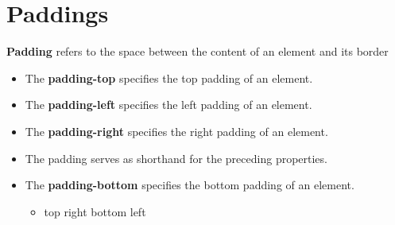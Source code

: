 \documentclass{report}
\begin{document}
    \pagebreak \bigbreak \noindent 
    \section{\LARGE Paddings}
    \bigbreak \noindent 
    \textbf{Padding} refers to the space between the content of an element and its border
    \bigbreak \noindent 
        \begin{itemize}
        \item The \textbf{padding-top} specifies the top padding of an element.
        \item The \textbf{padding-left} specifies the left padding of an element.
        \item The \textbf{padding-right} specifies the right padding of an element.
        \item The padding serves as shorthand for the preceding properties. \item The \textbf{padding-bottom} specifies the bottom padding of an element.
            \begin{itemize}
                \item top right bottom left
            \end{itemize}
    \end{itemize}

    \pagebreak \bigbreak \noindent 
\end{document}
